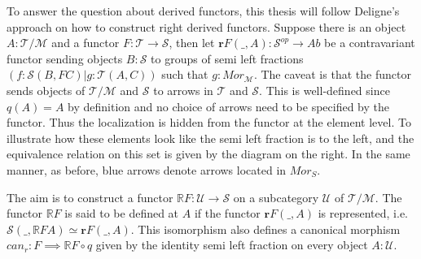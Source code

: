         \begin{center}
        \end{center}

        To answer the question about derived functors, this thesis will follow Deligne's approach on how to construct right derived functors. Suppose there is an object $A:\mathcal{T}/\mathcal{M}$ and a functor $F:\mathcal{T}\rightarrow\mathcal{S}$, then let $\textbf{r}$$F(\_,A):\mathcal{S}^{op}\rightarrow Ab$ be a contravariant functor sending objects $B:\mathcal{S}$ to groups of semi left fractions $(f:\mathcal{S}(B,FC)|g:\mathcal{T}(A,C))$ such that $g:Mor_{\mathcal{M}}$. The caveat is that the functor sends objects of $\mathcal{T}/\mathcal{M}$ and $\mathcal{S}$ to arrows in $\mathcal{T}$ and $\mathcal{S}$. This is well-defined since $q(A)=A$ by definition and no choice of arrows need to be specified by the functor. Thus the localization is hidden from the functor at the element level. To illustrate how these elements look like the semi left fraction is to the left, and the equivalence relation on this set is given by the diagram on the right. In the same manner, as before, blue arrows denote arrows located in $Mor_{S}$.

        \begin{center}
        \end{center}
        
        The aim is to construct a functor $\mathbb{R}F:\mathcal{U}\rightarrow \mathcal{S}$ on a subcategory $\mathcal{U}$ of $\mathcal{T}/\mathcal{M}$. The functor $\mathbb{R}F$ is said to be defined at $A$ if the functor $\textbf{r} F(\_,A)$ is represented, i.e. $\mathcal{S}(\_,\mathbb{R}FA)\simeq$$\textbf{r}$$F(\_,A)$. This isomorphism also defines a canonical morphism $can_r:F\implies \mathbb{R}F\circ q$ given by the identity semi left fraction on every object $A:\mathcal{U}$.
        
